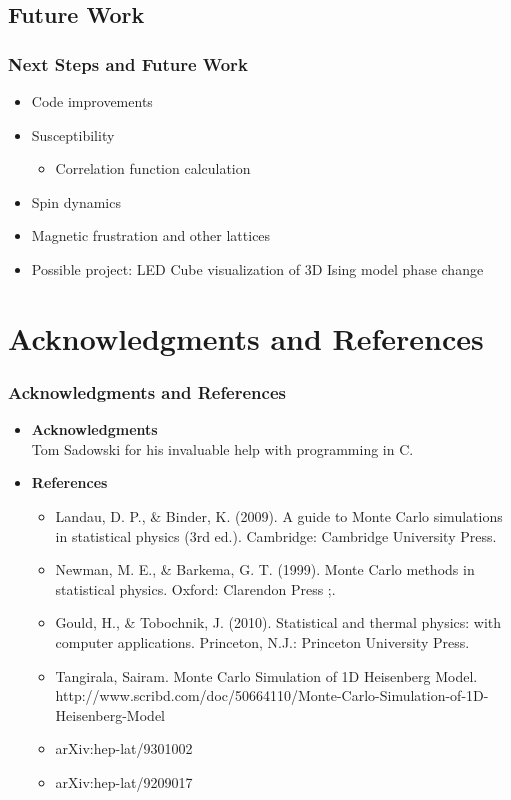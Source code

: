 \documentclass{beamer}
\begin{document}
  \subsection*{Future Work}
  \begin{frame}
    \frametitle{Next Steps and Future Work}
    \begin{itemize}
      \item Code improvements
    	\item Susceptibility
    	\begin{itemize}
    		\item Correlation function calculation    	
    	\end{itemize}
    	\item Spin dynamics
    	\item Magnetic frustration and other lattices
    	\item Possible project: LED Cube visualization of 3D Ising model phase change
    \end{itemize}
  \end{frame}
  
  \section{Acknowledgments and References}
  \begin{frame}
  	\frametitle{Acknowledgments and References}
  	\begin{itemize}
  		\item \textbf{Acknowledgments} \\
  					Tom Sadowski for his invaluable help with programming in C.
  		\item \textbf{References}
  		\begin{itemize}
  			\item Landau, D. P., & Binder, K. (2009). A guide to Monte Carlo simulations in statistical physics (3rd ed.). Cambridge: Cambridge University Press.
  			\item Newman, M. E., & Barkema, G. T. (1999). Monte Carlo methods in statistical physics. Oxford: Clarendon Press ;.
  			\item Gould, H., & Tobochnik, J. (2010). Statistical and thermal physics: with computer applications. Princeton, N.J.: Princeton University Press.
  			\item Tangirala, Sairam. Monte Carlo Simulation of 1D Heisenberg Model. http://www.scribd.com/doc/50664110/Monte-Carlo-Simulation-of-1D-Heisenberg-Model
  			\item arXiv:hep-lat/9301002
  			\item arXiv:hep-lat/9209017
  		\end{itemize}
  	\end{itemize}
  \end{frame}
  
  
\end{document}
